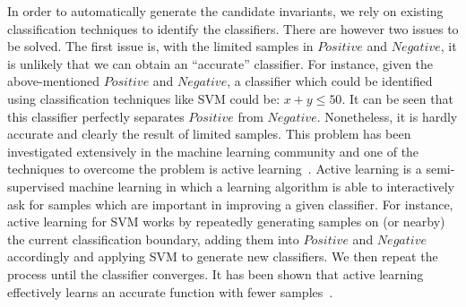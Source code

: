 In order to automatically generate the candidate invariants, we rely on existing classification techniques to identify the classifiers. There are however two issues to be solved. The first issue is, with the limited samples in $\mathit{Positive}$ and $\mathit{Negative}$, it is unlikely that we can obtain an ``accurate'' classifier. For instance, given the above-mentioned $\mathit{Positive}$ and $\mathit{Negative}$, a classifier which could be identified using classification techniques like SVM could be: $x+y \leq 50$. It can be seen that this classifier perfectly separates $\mathit{Positive}$ from $\mathit{Negative}$. Nonetheless, it is hardly accurate and clearly the result of limited samples. This problem has been investigated extensively in the machine learning community and one of the techniques to overcome the problem is active learning~\cite{active}. Active learning is a semi-supervised machine learning in which a learning algorithm is able to interactively ask for samples which are important in improving a given classifier. For instance, active learning for SVM works by repeatedly generating samples on (or nearby) the current classification boundary, adding them into $\mathit{Positive}$ and $\mathit{Negative}$ accordingly and applying SVM to generate new classifiers. We then repeat the process until the classifier converges. It has been shown that active learning effectively learns an accurate function with fewer samples~\cite{DBLP:conf/icml/SchohnC00}.

